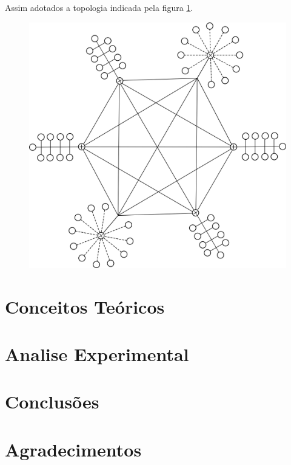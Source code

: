 \documentclass[conference]{IEEEtran}
\begin{document}
	Assim adotados a topologia indicada pela figura \ref{fig:topologia}.
	
	\begin{figure}[h]
		\centering
		\includegraphics[scale=0.45]{./images/topologia}
		\caption{}
		\label{fig:topologia}
	\end{figure}

\section{Conceitos Teóricos}

\section{Analise Experimental}

\section{Conclusões}



\section*{Agradecimentos}


\end{document}
